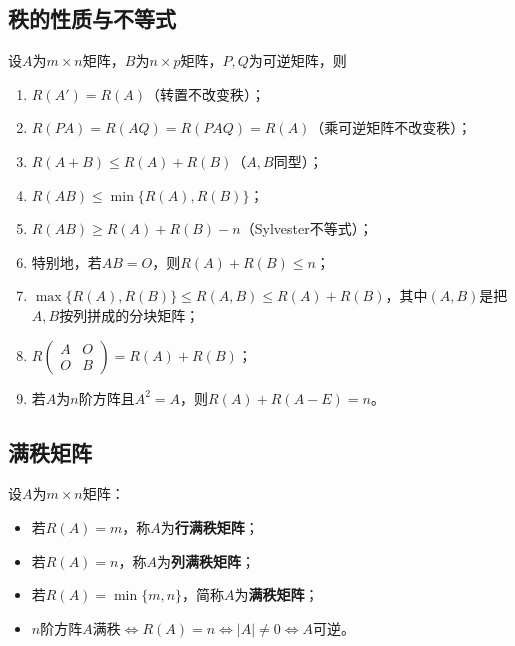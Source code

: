 
\subsection{秩的性质与不等式}

设$A$为$m\times n$矩阵，$B$为$n\times p$矩阵，$P,Q$为可逆矩阵，则
\begin{enumerate}
\item $R(A')=R(A)$（转置不改变秩）；
\item $R(PA)=R(AQ)=R(PAQ)=R(A)$（乘可逆矩阵不改变秩）；
\item $R(A+B)\le R(A)+R(B)$（$A,B$同型）；
\item $R(AB)\le\min\{R(A),R(B)\}$；
\item $R(AB)\ge R(A)+R(B)-n$（Sylvester不等式）；
\item 特别地，若$AB=O$，则$R(A)+R(B)\le n$；
\item $\max\{R(A),R(B)\}\le R(A,B)\le R(A)+R(B)$，其中$(A,B)$是把$A,B$按列拼成的分块矩阵；
\item $R\begin{pmatrix}A&O\\O&B\end{pmatrix}=R(A)+R(B)$；
\item 若$A$为$n$阶方阵且$A^2=A$，则$R(A)+R(A-E)=n$。
\end{enumerate}



\subsection{满秩矩阵}

设$A$为$m\times n$矩阵：
\begin{itemize}
\item 若$R(A)=m$，称$A$为\textbf{行满秩矩阵}；
\item 若$R(A)=n$，称$A$为\textbf{列满秩矩阵}；
\item 若$R(A)=\min\{m,n\}$，简称$A$为\textbf{满秩矩阵}；
\item $n$阶方阵$A$满秩$\iff R(A)=n\iff|A|\neq0\iff A$可逆。
\end{itemize}


